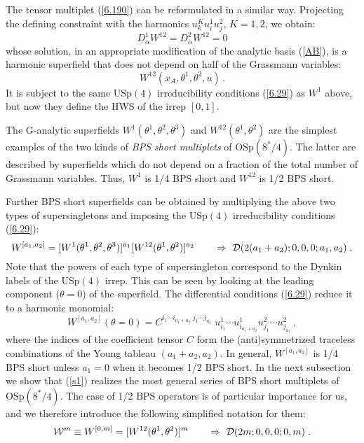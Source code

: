 \documentclass[a4paper,11pt]{article}
\begin{document}
The tensor multiplet (\ref{6.190}) can be reformulated in a similar way.
Projecting the defining constraint with the harmonics $u^K_k u^1_{i}u^2_j$,
$K=1,2$, we obtain:
\begin{equation}\label{6.270}
D^1_\alpha W^{12} = D^2_\alpha W^{12}= 0
\end{equation}
whose solution, in an appropriate modification of the analytic basis
(\ref{AB}), is a harmonic superfield that does not depend on half of the
Grassmann variables:
\begin{equation}\label{6.280}
W^{12}(x_A,\theta^1,\theta^2,u) \, .
\end{equation}
It is subject to the same $\mbox{USp}(4)$ irreducibility conditions
(\ref{6.29}) as $W^1$ above, but now they define the HWS of the irrep $[0,1]$.

The G-analytic superfields $W^{1}(\theta^1,\theta^2,\theta^{3})$ and
$W^{12}(\theta^1,\theta^2)$ are the simplest examples of the two kinds of {\it
BPS short multiplets} of  $\mbox{OSp}(8^{*}/4)$. The latter are described by
superfields which do not depend on a fraction of the total number of Grassmann
variables. Thus, $W^1$ is 1/4 BPS short and $W^{12}$ is 1/2 BPS short.

Further BPS short superfields can be obtained by multiplying the above two
types of supersingletons and imposing the $\mbox{USp}(4)$ irreducibility
conditions (\ref{6.29}):
\begin{equation}\label{s1}
  W^{[a_1,a_2]} = [W^{1}(\theta^1,\theta^2,\theta^{3})]^{a_1}
   [W^{12}(\theta^1,\theta^2)]^{a_2}  \qquad \Rightarrow \ {\cal
D}(2(a_1+a_2);0,0,0;a_1,a_2)\;.
\end{equation}
Note that the powers of each type of supersingleton correspond to the Dynkin
labels of the $\mbox{USp}(4)$ irrep. This can be seen by looking at the leading
component ($\theta=0$) of the superfield. The differential conditions
(\ref{6.29}) reduce it to a harmonic monomial:
\begin{equation}\label{s101}
  W^{[a_1,a_2]}(\theta=0) = C^{i_1\cdots i_{a_1+a_2}\; j_1\cdots j_{a_2}}
  \; u^1_{i_1}\cdots u^1_{i_{a_1+a_2}} u^2_{j_1} \cdots u^2_{j_{a_2}} \, ,
\end{equation}
where the indices of the coefficient tensor $C$ form the (anti)symmetrized
traceless combinations of the Young tableau $(a_1+a_2,a_2)$. In general,
$W^{[a_1,a_2]}$ is 1/4 BPS short unless $a_1=0$ when it becomes 1/2 BPS short.
In the next subsection we show that (\ref{s1}) realizes the most general series
of BPS short multiplets of $\mbox{OSp}(8^{*}/4)$. The case of 1/2 BPS operators
is of particular importance for us, and we therefore introduce the following
simplified notation for them:
\begin{equation}\label{12bps}
  {\cal W}^m \equiv  W^{[0,m]} = [W^{12}(\theta^1,\theta^2)]^{m}  \qquad \Rightarrow \ {\cal
D}(2m;0,0,0;0,m)\;.
\end{equation}
\end{document}
